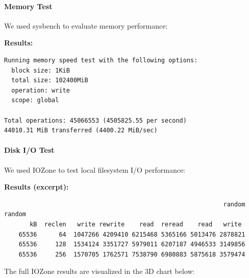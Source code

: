 \hypertarget{memory-test}{%
\paragraph{Memory Test}\label{memory-test}}

We used sysbench to evaluate memory performance:

\begin{Shaded}
\begin{Highlighting}[]
\end{Highlighting}
\end{Shaded}

\textbf{Results:}

\begin{verbatim}
Running memory speed test with the following options:
  block size: 1KiB
  total size: 102400MiB
  operation: write
  scope: global

Total operations: 45066553 (4505825.55 per second)
44010.31 MiB transferred (4400.22 MiB/sec)
\end{verbatim}

\hypertarget{disk-io-test}{%
\paragraph{Disk I/O Test}\label{disk-io-test}}

We used IOZone to test local filesystem I/O performance:

\begin{Shaded}
\begin{Highlighting}[]
  
\end{Highlighting}
\end{Shaded}

\textbf{Results (excerpt):}

\begin{verbatim}
                                                            random    random
       kB  reclen   write rewrite    read  reread    read   write
    65536      64  1047266 4209410 6215468 5365166 5013476 2878821
    65536     128  1534124 3351727 5979011 6207187 4946533 3149856
    65536     256  1570705 1762571 7538790 6980883 5875618 3579474
\end{verbatim}

The full IOZone results are visualized in the 3D chart below:

